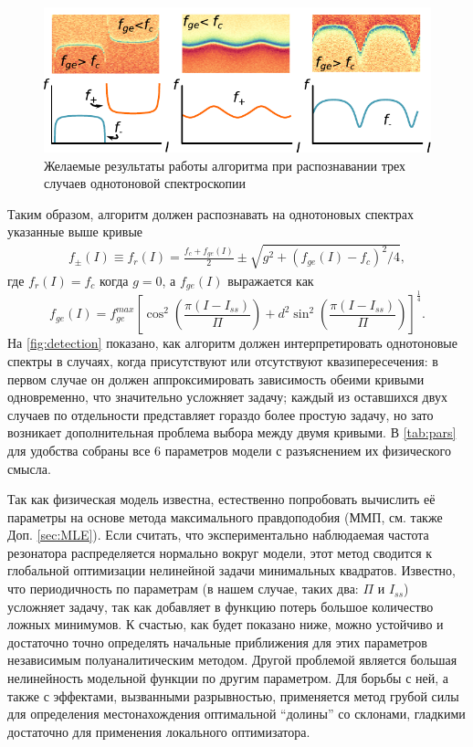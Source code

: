 \documentclass[14pt, a4paper]{extreport}
\numberwithin{equation}{section}
\begin{document}
\begin{figure}
	\centering
	\includegraphics[width=.8\linewidth]{Pictures/detection}
	\caption{Желаемые результаты работы алгоритма при распознавании трех случаев однотоновой спектроскопии}
	\label{fig:detection}
\end{figure}

Таким образом, алгоритм должен распознавать на однотоновых спектрах указанные выше кривые \cite{filipp2011multimode}
\begin{align}
f_\pm(I) \equiv f_r(I) = \frac{f_c + f_{ge}(I)}{2} \pm \sqrt{g^2+(f_{ge}(I) - f_c)^2/4},\label{eq:f_r}
\end{align}
где $f_r(I) = f_c$ когда $g=0$, а $f_{ge}(I)$ выражается как
\begin{equation}
f_{ge}(I) = f_{ge}^{max} \left[\cos^2\left(\frac{\pi(I-I_{ss})}{\Pi}\right)+d^2 \sin^2 \left(\frac{\pi(I-I_{ss})}{\Pi}\right)\right]^\frac{1}{4}.
\label{eq:tr_spectrum}
\end{equation}
На \autoref{fig:detection} показано, как алгоритм должен интерпретировать однотоновые спектры в случаях, когда присутствуют или отсутствуют квазипересечения: в первом случае он должен аппроксимировать зависимость обеими кривыми одновременно, что значительно усложняет задачу; каждый из оставшихся двух случаев по отдельности представляет гораздо более простую задачу, но зато возникает дополнительная проблема выбора между двумя кривыми. В \autoref{tab:pars} для удобства собраны все 6 параметров модели с разъяснением их физического смысла.

Так как физическая модель известна, естественно попробовать вычислить её параметры на основе метода максимального правдоподобия (ММП, см. также Доп. \ref{sec:MLE}). Если считать, что экспериментально наблюдаемая частота резонатора распределяется нормально вокруг модели, этот метод сводится к глобальной оптимизации нелинейной задачи минимальных квадратов. Известно, что периодичность по параметрам (в нашем случае, таких два: $\Pi$ и $I_{ss}$) усложняет задачу, так как добавляет в функцию потерь большое количество ложных минимумов. К счастью, как будет показано ниже, можно устойчиво и достаточно точно определять начальные приближения для этих параметров независимым полуаналитическим методом. Другой проблемой является большая нелинейность модельной функции по другим параметром. Для борьбы с ней, а также с эффектами, вызванными разрывностью, применяется метод грубой силы для определения местонахождения оптимальной ``долины'' со склонами, гладкими достаточно для применения локального оптимизатора. 
\end{document}
